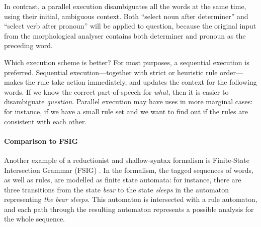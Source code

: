 In contrast, a parallel execution disambiguates all the words at the same time, using their initial, ambiguous context. Both ``select noun after determiner'' and ``select verb after pronoun'' will be applied to question, because the original input from the morphological analyser contains both determiner and pronoun as the preceding word.

Which execution scheme is better? For most purposes, a sequential execution is preferred.  Sequential execution–--together with strict or heuristic rule order---makes the rule take action immediately, and updates the context for the following words. If we know the correct part-of-speech for \emph{what}, then it is easier to disambiguate \emph{question}.
Parallel execution may have uses in more marginal cases: for instance, if we have a small rule set and we want to find out if the rules are consistent with each other. 



% 
% 
% 
% 
% 
\paragraph{Comparison to FSIG} 
Another example of a reductionist and shallow-syntax formalism is
Finite-State Intersection Grammar (FSIG) \citep{koskenniemi90}. In the
formalism, the tagged sequences of words, as well as rules, are modelled
as finite state automata: for instance, there are three transitions from
the state \emph{bear} to the state \emph{sleeps} in the automaton
representing \emph{the bear sleeps}. This automaton is intersected with
a rule automaton, and each path through the resulting automaton
represents a possible analysis for the whole sequence.
 
